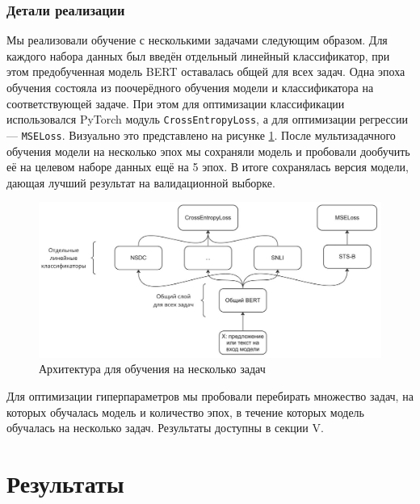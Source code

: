 \documentclass[conference]{IEEEtran}
\begin{document}
\subsubsection{Детали реализации}
Мы реализовали обучение с несколькими задачами следующим образом. Для каждого набора данных был введён отдельный линейный классификатор, при этом предобученная модель BERT оставалась общей для всех задач. Одна эпоха обучения состояла из поочерёдного обучения модели и классификатора на соответствующей задаче. При этом для оптимизации классификации использовался PyTorch модуль \texttt{CrossEntropyLoss}, а для оптимизации регрессии --- \texttt{MSELoss}. Визуально это представлено на рисунке \ref{fig:multi-task-learning-architecture}. После мультизадачного обучения модели на несколько эпох мы сохраняли модель и пробовали дообучить её на целевом наборе данных ещё на 5 эпох. В итоге сохранялась версия модели, дающая лучший результат на валидационной выборке.
\begin{figure}[h!]
    \centering
    \includegraphics*[width=\linewidth]{multi-task-learning-architecture.jpg}
    \caption{Архитектура для обучения на несколько задач}
    \label{fig:multi-task-learning-architecture}
\end{figure}

Для оптимизации гиперпараметров мы пробовали перебирать множество задач, на которых обучалась модель и количество эпох, в течение которых модель обучалась на несколько задач. Результаты доступны в секции V.

\section{Результаты}
\end{document}
